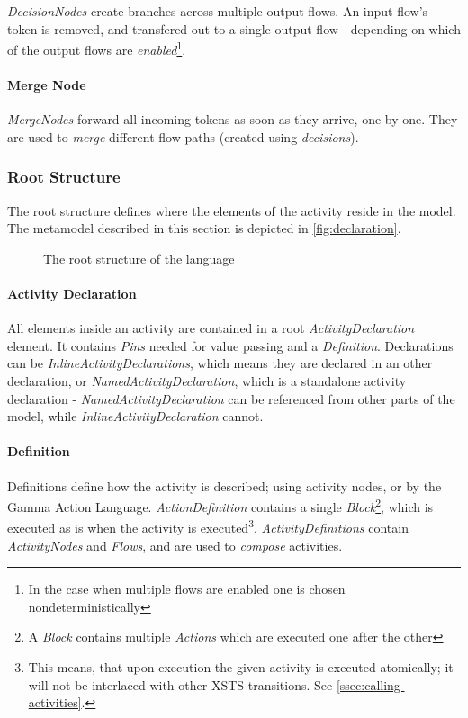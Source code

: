 \emph{DecisionNodes} create branches across multiple output flows. An input flow's token is removed, and transfered out to a single output flow - depending on which of the output flows are \emph{enabled}\footnote{In the case when multiple flows are enabled one is chosen nondeterministically}.

\paragraph{Merge Node}

\emph{MergeNodes} forward all incoming tokens as soon as they arrive, one by one. They are used to \emph{merge} different flow paths (created using \emph{decisions}).

\subsubsection*{Root Structure}\label{ssec:root_structure}

The root structure defines where the elements of the activity reside in the model. The metamodel described in this section is depicted in \autoref{fig:declaration}.

\begin{figure}[!ht]
	\centering
	
	\caption{The root structure of the language}
	\label{fig:declaration}
\end{figure}

\paragraph{Activity Declaration}\label{par:activity_declaration}

All elements inside an activity are contained in a root \emph{ActivityDeclaration} element. It contains \emph{Pins} needed for value passing and a \emph{Definition}. Declarations can be \emph{InlineActivityDeclarations}, which means they are declared in an other declaration, or \emph{NamedActivityDeclaration}, which is a standalone activity declaration - \emph{NamedActivityDeclaration} can be referenced from other parts of the model, while \emph{InlineActivityDeclaration} cannot.

\paragraph{Definition}\label{par:definition}

Definitions define how the activity is described; using activity nodes, or by the Gamma Action Language. \emph{ActionDefinition} contains a single \emph{Block}\footnote{A \emph{Block} contains multiple \emph{Actions} which are executed one after the other}, which is executed as is when the activity is executed\footnote{This means, that upon execution the given activity is executed atomically; it will not be interlaced with other XSTS transitions. See \autoref{ssec:calling-activities}.}. \emph{ActivityDefinitions} contain \emph{ActivityNodes} and \emph{Flows}, and are used to \emph{compose} activities.

